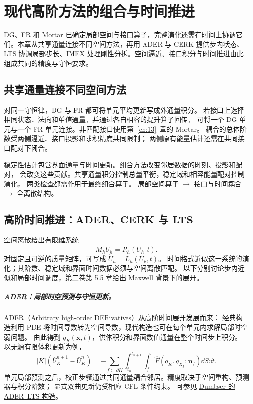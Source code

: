 \chapter{现代高阶方法的组合与时间推进}\label{ch:14}
\begin{chaptersummary}
DG、FR 和 Mortar 已确定局部空间与接口算子，完整演化还需在时间上协调它们。本章从共享通量连接不同空间方法，再用 ADER 与 CERK 提供步内状态、LTS 协调局部步长、IMEX 处理刚性分拆。空间逼近、接口积分与时间推进由此组成共同的精度与守恒要求。
\end{chaptersummary}

\section{共享通量连接不同空间方法}
对同一守恒律，DG 与 FR 都可将单元平均更新写成外通量积分。
若接口上选择相同状态、法向和单值通量，并通过各自相容的提升算子回传，
可将一个 DG 单元与一个 FR 单元连接。非匹配接口使用第~\ref{ch:13}~章的 Mortar。
耦合的总体阶数受两侧逼近、接口投影和求积精度共同限制；
两侧原有能量估计还需在共同接口配对下闭合。

{稳定性估计包含界面通量与时间更新。组合方法改变邻居数据的时刻、投影和配对，
会改变这些贡献。共享通量积分控制总量平衡，稳定域和相容能量配对控制演化，
两类检查都需作用于最终组合算子。}
{局部空间算子 $\longrightarrow$ 接口与时间耦合 $\longrightarrow$ 全离散结构。}
\section{高阶时间推进：ADER、CERK 与 LTS}\label{sec:v1-time}
空间离散给出有限维系统
\[
M_h\dot U_h=R_h(U_h,t).
\]
对固定且可逆的质量矩阵，可写成 $\dot U_h=L_h(U_h,t)$。
时间格式近似这一系统的演化；其阶数、稳定域和界面时间数据必须与空间离散匹配。
以下分别讨论步内近似和局部时间调度，第二卷第 5.5 章给出 Maxwell 背景下的展开。

\paragraph{ADER：局部时空预测与守恒更新。}
ADER（Arbitrary high-order DERivatives）从高阶时间展开发展而来：
经典构造利用 PDE 将时间导数转为空间导数，现代构造也可在每个单元内求解局部时空弱问题。
由此得到 $q_K(\bm x,t)$，供体积分和界面数值通量在整个时间步上积分。
以无源有限体积更新为例，
\[
|K|(\bar U_K^{n+1}-\bar U_K^n)
=-\sum_{f\subset\partial K}\int_{t_n}^{t_{n+1}}\int_f
\widehat F(q_K,q_{K_f};\bm n_f)\dd S\dd t.
\]
单元局部预测之后，校正步骤通过共同通量耦合邻居。精度取决于空间重构、预测器与积分阶数；
显式双曲更新仍受相应 CFL 条件约束。
可参见 \href{https://doi.org/10.1016/j.cma.2014.07.019}{Dumbser 的 ADER--LTS 构造}。

